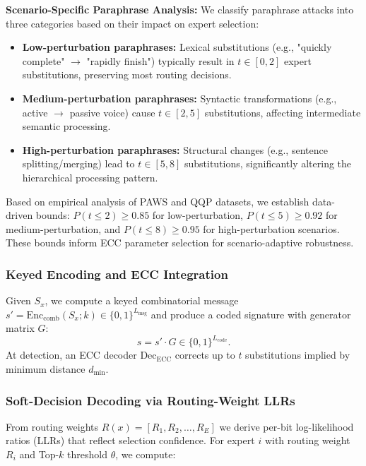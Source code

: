 \textbf{Scenario-Specific Paraphrase Analysis:} We classify paraphrase attacks into three categories based on their impact on expert selection:

\begin{itemize}
\item \textbf{Low-perturbation paraphrases:} Lexical substitutions (e.g., "quickly complete" $\rightarrow$ "rapidly finish") typically result in $t \in [0,2]$ expert substitutions, preserving most routing decisions.
\item \textbf{Medium-perturbation paraphrases:} Syntactic transformations (e.g., active $\rightarrow$ passive voice) cause $t \in [2,5]$ substitutions, affecting intermediate semantic processing.
\item \textbf{High-perturbation paraphrases:} Structural changes (e.g., sentence splitting/merging) lead to $t \in [5,8]$ substitutions, significantly altering the hierarchical processing pattern.
\end{itemize}

Based on empirical analysis of PAWS and QQP datasets, we establish data-driven bounds: $P(t \leq 2) \geq 0.85$ for low-perturbation, $P(t \leq 5) \geq 0.92$ for medium-perturbation, and $P(t \leq 8) \geq 0.95$ for high-perturbation scenarios. These bounds inform ECC parameter selection for scenario-adaptive robustness.

\subsubsection{Keyed Encoding and ECC Integration}

Given $S_x$, we compute a keyed combinatorial message $s' = \text{Enc}_{\text{comb}}(S_x; k) \in \{0,1\}^{L_{\text{msg}}}$ and produce a coded signature with generator matrix $G$:
\begin{equation}
s = s' \cdot G \in \{0,1\}^{L_{\text{code}}}.
\end{equation}
At detection, an ECC decoder $\text{Dec}_{\text{ECC}}$ corrects up to $t$ substitutions implied by minimum distance $d_{\min}$.

\subsubsection{Soft-Decision Decoding via Routing-Weight LLRs}

From routing weights $R(x) = [R_1, R_2, \ldots, R_E]$ we derive per-bit log-likelihood ratios (LLRs) that reflect selection confidence. For expert $i$ with routing weight $R_i$ and Top-$k$ threshold $\theta$, we compute:


